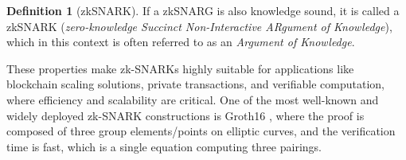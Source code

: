 \documentclass[12pt]{article}
\theoremstyle{definition}
\newtheorem{definition}{Definition}[section]
\begin{document}
\begin{definition}[zkSNARK]If a zkSNARG is also knowledge sound, it is called a zkSNARK (\emph{zero-knowledge Succinct Non-Interactive ARgument of Knowledge}), which in this context is often referred to as an \emph{Argument of Knowledge}.
\end{definition}

These properties make zk-SNARKs highly suitable for applications like blockchain scaling solutions, private transactions, and verifiable computation, where efficiency and scalability are critical. One of the most well-known and widely deployed zk-SNARK constructions is Groth16 \cite{groth16}, where the proof is composed of three group elements/points on elliptic curves, and the verification time is fast, which is a single equation computing three pairings.

\printbibliography
\end{document}
